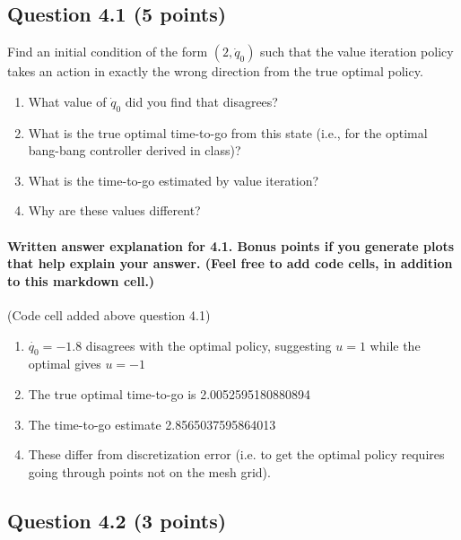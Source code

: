 \documentclass[11pt]{article}
\begin{document}
    \subsection{Question 4.1 (5 points)}\label{question-4.1-5-points}

Find an initial condition of the form \((2, \dot{q}_0)\) such that the
value iteration policy takes an action in exactly the wrong direction
from the true optimal policy.

\begin{enumerate}
\def\labelenumi{\alph{enumi})}
\item
  What value of \(\dot{q}_0\) did you find that disagrees?
\item
  What is the true optimal time-to-go from this state (i.e., for the
  optimal bang-bang controller derived in class)?
\item
  What is the time-to-go estimated by value iteration?
\item
  Why are these values different?
\end{enumerate}

    \paragraph{Written answer explanation for 4.1. Bonus points if you
generate plots that help explain your answer. (Feel free to add code
cells, in addition to this markdown
cell.)}\label{written-answer-explanation-for-4.1.-bonus-points-if-you-generate-plots-that-help-explain-your-answer.-feel-free-to-add-code-cells-in-addition-to-this-markdown-cell.}

(Code cell added above question 4.1)

\begin{enumerate}
\def\labelenumi{\alph{enumi})}
\item
  \(\dot{q_0}=-1.8\) disagrees with the optimal policy, suggesting
  \(u=1\) while the optimal gives \(u=-1\)
\item
  The true optimal time-to-go is 2.0052595180880894
\item
  The time-to-go estimate 2.8565037595864013
\item
  These differ from discretization error (i.e. to get the optimal policy
  requires going through points not on the mesh grid).
\end{enumerate}

    \subsection{Question 4.2 (3 points)}\label{question-4.2-3-points}
\end{document}
